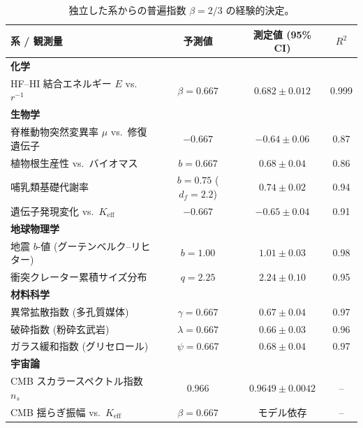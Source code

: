 \documentclass[11pt,a4paper]{article}
\begin{document}
	\begin{table}[H]
		\centering
		\caption{独立した系からの普遍指数 \(\beta = 2/3\) の経験的決定。}
		\label{tab:empirical-beta}
		\small
		\begin{tabular}{lccc}
			\toprule
			\textbf{系 / 観測量} & \textbf{予測値} & \textbf{測定値 (95\% CI)} & \(R^2\) \\
			\midrule
			\textbf{化学} & & & \\
			\quad HF–HI 結合エネルギー \(E\) vs.\ \(r^{-1}\) & \(\beta = 0.667\) & \(0.682 \pm 0.012\) & 0.999 \\
			\textbf{生物学} & & & \\
			\quad 脊椎動物突然変異率 \(\mu\) vs.\ 修復遺伝子 & \(-0.667\) & \(-0.64 \pm 0.06\) & 0.87 \\
			\quad 植物根生産性 vs.\ バイオマス & \(b = 0.667\) & \(0.68 \pm 0.04\) & 0.86 \\
			\quad 哺乳類基礎代謝率 & \(b = 0.75\) (\(d_f=2.2\)) & \(0.74 \pm 0.02\) & 0.94 \\
			\quad 遺伝子発現変化 vs.\ \(K_{\mathrm{eff}}\) & \(-0.667\) & \(-0.65 \pm 0.04\) & 0.91 \\
			\textbf{地球物理学} & & & \\
			\quad 地震 \(b\)-値 (グーテンベルク–リヒター) & \(b = 1.00\) & \(1.01 \pm 0.03\) & 0.98 \\
			\quad 衝突クレーター累積サイズ分布 & \(q = 2.25\) & \(2.24 \pm 0.10\) & 0.95 \\
			\textbf{材料科学} & & & \\
			\quad 異常拡散指数 (多孔質媒体) & \(\gamma = 0.667\) & \(0.67 \pm 0.04\) & 0.97 \\
			\quad 破砕指数 (粉砕玄武岩) & \(\lambda = 0.667\) & \(0.66 \pm 0.03\) & 0.96 \\
			\quad ガラス緩和指数 (グリセロール) & \(\psi = 0.667\) & \(0.68 \pm 0.04\) & 0.97 \\
			\textbf{宇宙論} & & & \\
			\quad CMB スカラースペクトル指数 \(n_s\) & \(0.966\) & \(0.9649 \pm 0.0042\) & -- \\
			\quad CMB 揺らぎ振幅 vs.\ \(K_{\mathrm{eff}}\) & \(\beta = 0.667\) & モデル依存 & -- \\
			\bottomrule
		\end{tabular}
	\end{table}
	
\end{document}
